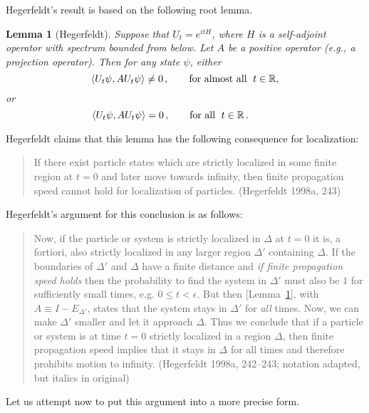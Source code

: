\documentclass[12pt]{article}
\newtheorem{lemma}{Lemma}
\theoremstyle{remark}
\begin{document}
Hegerfeldt's result is based on the following root lemma.
\begin{lemma}[Hegerfeldt] Suppose that $U_{t}=e^{itH}$, where $H$ is a
  self-adjoint operator with spectrum bounded from below.  Let $A$ be
  a positive operator (e.g., a projection operator).  Then for any
  state $\psi$, either
\[ \langle U_{t}\psi
,AU_{t}\psi \rangle \neq 0\,, \qquad \mbox{\textnormal{for almost all
    }}\; t\in \mathbb{R} ,\] or
\[ \hspace{-3em} \langle U_{t}\psi
,AU_{t}\psi \rangle =0\,, \qquad \mbox{\textnormal{for all }}\; t\in
\mathbb{R} \,.\] \label{gch}
\end{lemma}
Hegerfeldt claims that this lemma has the following consequence for
localization:
\begin{quote} If there exist particle states which are strictly
  localized in some finite region at $t=0$ and later move towards
  infinity, then finite propagation speed cannot hold for localization
  of particles. (Hegerfeldt 1998a, 243) \end{quote} Hegerfeldt's
argument for this conclusion is as follows: \begin{quote} Now, if the
  particle or system is strictly localized in $\Delta $ at $t=0$ it
  is, a fortiori, also strictly localized in any larger region $\Delta
  '$ containing $\Delta$.  If the boundaries of $\Delta '$ and
  $\Delta$ have a finite distance and \emph{if finite propagation
    speed holds} then the probability to find the system in $\Delta '$
  must also be $1$ for sufficiently small times, e.g.  $0\leq
  t<\epsilon$.  But then [Lemma~\ref{gch}], with $A\equiv I-E_{\Delta
    '}$, states that the system stays in $\Delta '$ for \emph{all}
  times.  Now, we can make $\Delta '$ smaller and let it approach
  $\Delta$.  Thus we conclude that if a particle or system is at time
  $t=0$ strictly localized in a region $\Delta$, then finite
  propagation speed implies that it stays in $\Delta$ for all times
  and therefore prohibits motion to infinity.  (Hegerfeldt 1998a,
  242--243; notation adapted, but italics in original)
\end{quote}  Let us attempt now to put this argument into a more precise form.
\end{document}
